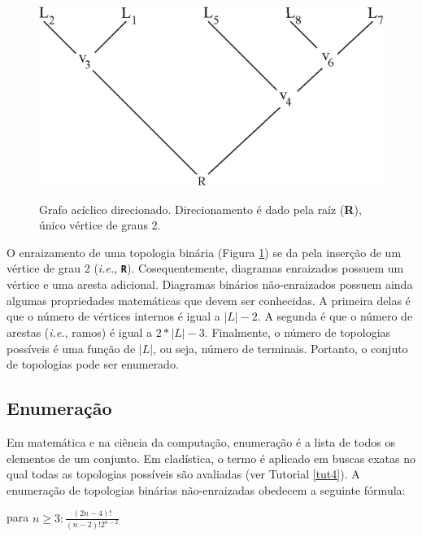 \begin{refsection}
  \begin{figure}[H]
      {\includegraphics[scale=0.60]{figures/tut3/directed_graph.eps}}
      {\caption[\textit{Gráfos}]{Grafo acíclico direcionado. Direcionamento é dado pela raíz (\textbf{R}), único vértice de graus 2.}\label{tut3:fig:rooted_graph}}
  \end{figure}

	
	O enraizamento de uma topologia binária (Figura \ref{tut3:fig:rooted_graph}) se da pela inserção de um vértice de grau 2 (\textit{i.e.}, \textbf{\texttt{R}}). Cosequentemente, diagramas enraizados possuem um vértice e uma aresta adicional. Diagramas binários não-enraizados possuem ainda algumas propriedades matemáticas que devem ser conhecidas. A primeira delas é que o número de vértices internos é igual a $|L|-2$. A segunda é que o número de arestas (\textit{i.e.}, ramos) é igual a $2*|L|-3$. Finalmente, o número de topologias possíveis é uma função de $|L|$, ou seja, número de terminais. Portanto, o conjuto de topologias pode ser enumerado.
	
\subsection{Enumeração}\label{tut3:context:enumeration}
	Em matemática e na ciência da computação, enumeração é a lista de todos os elementos de um conjunto. Em cladística, o termo é aplicado em buscas exatas no qual todas as topologias possíveis são avaliadas (ver Tutorial \ref{tut4}). A enumeração de topologias binárias não-enraizadas obedecem a seguinte fórmula:

\begin{center}
	para $n\geq3\colon\frac{(2n-4)!}{(n-2)!2^{n-2}}$
\end{center}
	

\end{refsection}
